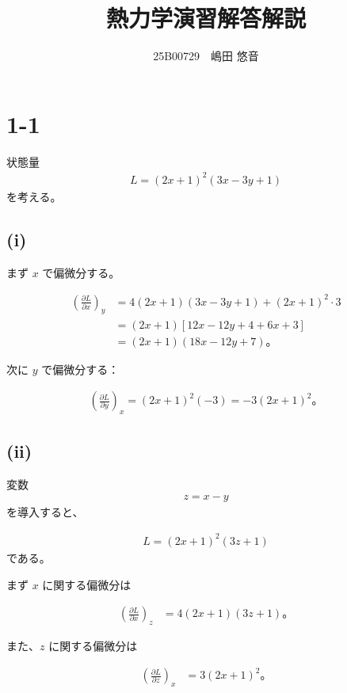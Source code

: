\documentclass[platex,dvipdfmx,a4paper]{jsarticle}
\title{熱力学演習解答解説}
\author{25B00729　嶋田 悠音}
\begin{document}
\maketitle
\begingroup
  \hypersetup{hidelinks}
  \tableofcontents
\endgroup
\clearpage

\section{1-1}

状態量
\begin{align*}
L=(2x+1)^2(3x-3y+1)
\end{align*}
を考える。

\subsection{(i)}

まず $x$ で偏微分する。

\begin{align*}
\left(\frac{\partial L}{\partial x}\right)_y
 &=4(2x+1)(3x-3y+1)
 +(2x+1)^2\cdot3 \\
 &= (2x+1)\left[12x-12y+4+6x+3\right] \\
 &= (2x+1)(18x-12y+7)。
\end{align*}

次に $y$ で偏微分する：

\begin{align*}
\left(\frac{\partial L}{\partial y}\right)_x
=(2x+1)^2(-3)
=-3(2x+1)^2。
\end{align*}

\subsection{(ii)}

変数
\begin{align*}
z=x-y
\end{align*}
を導入すると、

\begin{align*}
L=(2x+1)^2(3z+1)
\end{align*}
である。

まず $x$ に関する偏微分は

\begin{align*}
\left(\frac{\partial L}{\partial x}\right)_z
 &=4(2x+1)(3z+1)。
\end{align*}

また、$z$ に関する偏微分は

\begin{align*}
\left(\frac{\partial L}{\partial z}\right)_x
 &=3(2x+1)^2。
\end{align*}
\end{document}

